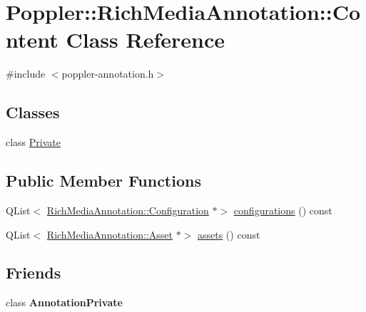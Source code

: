 \hypertarget{class_poppler_1_1_rich_media_annotation_1_1_content}{}\section{Poppler\+:\+:Rich\+Media\+Annotation\+:\+:Content Class Reference}
\label{class_poppler_1_1_rich_media_annotation_1_1_content}


{\ttfamily \#include $<$poppler-\/annotation.\+h$>$}

\subsection*{Classes}
\begin{DoxyCompactItemize}
\item 
class \hyperlink{class_poppler_1_1_rich_media_annotation_1_1_content_1_1_private}{Private}
\end{DoxyCompactItemize}
\subsection*{Public Member Functions}
\begin{DoxyCompactItemize}
\item 
Q\+List$<$ \hyperlink{class_poppler_1_1_rich_media_annotation_1_1_configuration}{Rich\+Media\+Annotation\+::\+Configuration} $\ast$$>$ \hyperlink{class_poppler_1_1_rich_media_annotation_1_1_content_aa05b36aa207a96c00abb651c5df80282}{configurations} () const
\item 
Q\+List$<$ \hyperlink{class_poppler_1_1_rich_media_annotation_1_1_asset}{Rich\+Media\+Annotation\+::\+Asset} $\ast$$>$ \hyperlink{class_poppler_1_1_rich_media_annotation_1_1_content_a64b6bd21fb70aeed088ac1e0ce94eea4}{assets} () const
\end{DoxyCompactItemize}
\subsection*{Friends}
\begin{DoxyCompactItemize}
\item 
\mbox{\label{class_poppler_1_1_rich_media_annotation_1_1_content_add0bc3e32e560f9e9eb3025587c1ad54}} 
class {\bfseries Annotation\+Private}
\end{DoxyCompactItemize}


